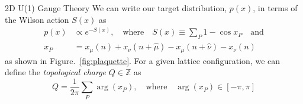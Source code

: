 \documentclass[final]{beamer}
\newlength{\colwidth}
\begin{document}
\begin{frame}[t]
\begin{columns}[t]
\begin{column}{\colwidth}
\begin{block}{2D U(1) Gauge Theory}
    We can write our target distribution, \(p(x)\), in terms of the Wilson action \(S(x)\) as
    \begin{align}
      p(x)&\propto e^{- S(x)}, \quad \text{where}\quad S(x) \equiv \sum_{P} 1 - \cos x_{P}\quad\text{and}\\
      x_{P} &= x_{\mu}(n) + x_{\nu}(n+\hat{\mu})-x_{\mu}(n+\hat{\nu}) - x_{\nu}(n)
    \end{align}
    as shown in Figure.~\ref{fig:plaquette}.
    For a given lattice configuration, we can define the \emph{topological charge} \(Q \in \mathbb{Z}\) as
    \begin{equation}
      Q = \frac{1}{2\pi}\sum_{P} \arg(x_{P}), \quad\text{where}\quad \arg(x_{P}) \in [-\pi,\pi]
    \end{equation}
  \end{block}


\end{column}
\end{columns}
\end{frame}
\end{document}
